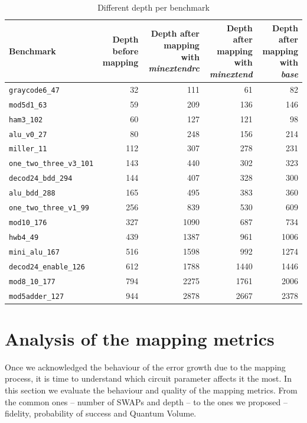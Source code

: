 \begin{table}[htbp]
\caption{\label{tab:depth_per_bench}
Different depth per benchmark}
\centering
\tiny
\begin{tabular}{lrrrr}
\hline
Benchmark & Depth before mapping & Depth after mapping with \emph{minextendrc} & Depth after mapping with \emph{minextend} & Depth after mapping with \emph{base}\\
\hline
\texttt{graycode6\_47} & 32 & 111 & 61 & 82\\
\texttt{mod5d1\_63} & 59 & 209 & 136 & 146\\
\texttt{ham3\_102} & 60 & 127 & 121 & 98\\
\texttt{alu\_v0\_27} & 80 & 248 & 156 & 214\\
\texttt{miller\_11} & 112 & 307 & 278 & 231\\
\texttt{one\_two\_three\_v3\_101} & 143 & 440 & 302 & 323\\
\texttt{decod24\_bdd\_294} & 144 & 407 & 328 & 300\\
\texttt{alu\_bdd\_288} & 165 & 495 & 383 & 360\\
\texttt{one\_two\_three\_v1\_99} & 256 & 839 & 530 & 609\\
\texttt{mod10\_176} & 327 & 1090 & 687 & 734\\
\texttt{hwb4\_49} & 439 & 1387 & 961 & 1006\\
\texttt{mini\_alu\_167} & 516 & 1598 & 992 & 1274\\
\texttt{decod24\_enable\_126} & 612 & 1788 & 1440 & 1446\\
\texttt{mod8\_10\_177} & 794 & 2275 & 1761 & 2006\\
\texttt{mod5adder\_127} & 944 & 2878 & 2667 & 2378\\
\hline
\end{tabular}
\end{table}

\section{Analysis of the mapping metrics}
\label{sec:org61109ff}
Once we acknowledged the behaviour of the error growth due to the mapping process, it is time to understand which circuit parameter affects it the most.
In this section we evaluate the behaviour and quality of the mapping metrics.
From the common ones -- number of SWAPs and depth -- to the ones we proposed -- fidelity, probability of success and Quantum Volume.



